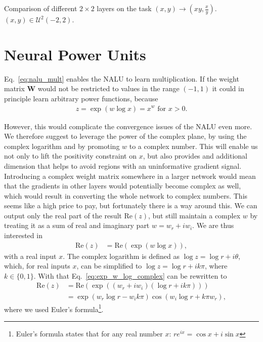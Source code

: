 \documentclass[9pt]{article}
\newcommand{\real}{\text{Re}}
\newcommand{\wre}{w_{r}}
\newcommand{\wim}{w_{i}}
\begin{document}
\begin{table}
  \centering
  \caption{Comparison of different $2\times2$ layers on the task
  $(x,y)\rightarrow(xy,\frac{x}{y})$.  $(x,y) \in \mathcal U^2(-2,2)$.}
  \label{tab:simple_err}
  
\end{table}





\section{Neural Power Units}%
\label{sec:neural_power_unit}

Eq.~\ref{eq:nalu_mult} enables the NALU to learn multiplication. If the weight
matrix $\bm W$ would not be restricted to values in the range $(-1,1)$ it could
in principle learn arbitrary power functions, because
\begin{align}
  z = \exp(w\log x) = x^w \text{ for } x>0.
\end{align}

However, this would complicate the convergence issues of the NALU even more.
We therefore suggest to leverage the power of the complex plane, by using the
complex logarithm and by promoting $w$ to a complex number.  This will enable
us not only to lift the positivity constraint on $x$, but also provides and
additional dimension that helps to avoid regions with an uninformative gradient
signal.  Introducing a complex
weight matrix somewhere in a larger network would mean that the gradients in
other layers would potentially become complex as well, which would result in
converting the whole network to complex numbers.  This seems like a high price
to pay, but fortunately there is a way around this.  We can output only the
real part of the result $\real(z)$, but still maintain a complex $w$ by
treating it as a sum of real and imaginary part $w=\wre+i\wim$. We are thus
interested in
\begin{align}
  \label{eq:exp_w_log_complex}
  \real(z) &= \real(\exp(w\log x)),
\end{align}
with a real input $x$. The complex logarithm is defined as $\log z=\log r +
i\theta$, which, for real inputs $x$, can be simplified to $\log z = \log r +
ik\pi$, where $k\in \{0,1\}$. With that Eq.~\ref{eq:exp_w_log_complex} can be
rewritten to
\begin{align}
  \real(z) &= \real(\exp((\wre + i\wim) (\log r + ik\pi))) \\
    &= \exp(\wre\log r - \wim k\pi) \cos(\wim\log r + k\pi\wre),
\end{align}
where we used Euler's formula\footnote{Euler's formula states that for any real
number $x$: $re^{ix} = \cos x + i\sin x$}.
\end{document}
